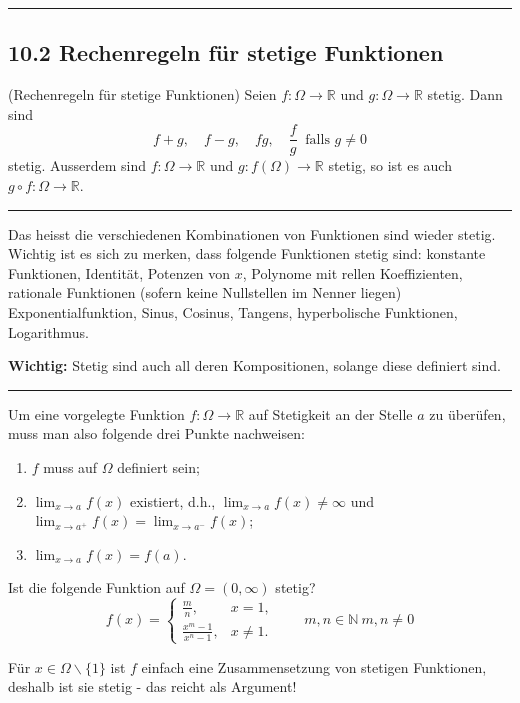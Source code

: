 \documentclass[a4paper,landscape,8pt]{extarticle}
\newcommand{\N}{\mathbb{N}}
\newcommand{\R}{\mathbb{R}}
\newcommand{\sep}{\vspace{5pt}\noindent\hrule\vspace{5pt}}
\newcommand{\Wichtig}{\textbf{Wichtig: }}
\begin{document}
\begin{multicols*}{4}
\sep

\subsection{10.2 Rechenregeln für stetige Funktionen}

\Satz (Rechenregeln für stetige Funktionen) Seien $f\colon\Omega\to\R$ und
$g\colon\Omega\to\R$ stetig. Dann sind
\[
f+g, \quad f-g, \quad fg, \quad \frac{f}{g} \ \text{ falls }g\neq 0
\]
stetig. Ausserdem sind $f\colon\Omega\to\R$ und $g\colon f(\Omega)\to\R$ stetig,
so ist es auch $g\circ f\colon\Omega\to\R$.

\sep

Das heisst die verschiedenen Kombinationen von Funktionen sind wieder stetig.
Wichtig ist es sich zu merken, dass folgende Funktionen stetig sind: konstante
Funktionen, Identität, Potenzen von $x$, Polynome mit rellen Koeffizienten,
rationale Funktionen (sofern keine Nullstellen im Nenner liegen)
Exponentialfunktion, Sinus, Cosinus, Tangens, hyperbolische Funktionen,
Logarithmus.

\Wichtig Stetig sind auch all deren Kompositionen, solange diese definiert sind.

\sep

 Um eine vorgelegte Funktion
$f\colon\Omega\to\R$ auf Stetigkeit an der Stelle $a$ zu überüfen, muss man also folgende drei Punkte nachweisen:
\begin{enumerate}[label=(\arabic*)]
  \item $f$ muss auf $\Omega$ definiert sein;
  \item $\lim_{x\to a}f(x)$ existiert, d.h., $\lim_{x\to a} f(x)\neq \infty$ und
  $\lim_{x\to a^+} f(x)=\lim_{x\to a^-} f(x)$;
  \item $\lim_{x\to a}f(x)=f(a)$.
\end{enumerate}

\begin{warmup}
\Bsp Ist die folgende Funktion auf $\Omega = (0,\infty)$ stetig?
\[
f(x)=\begin{cases}
\frac{m}{n}, & x=1,\\
\frac{x^m-1}{x^n-1}, & x\neq 1.
\end{cases}
\qquad m,n\in\N \ m,n\neq 0
\]

Für $x\in\Omega \backslash \{1\}$ ist $f$ einfach eine Zusammensetzung von
stetigen Funktionen, deshalb ist sie stetig - das reicht als Argument!


\end{warmup}
\end{multicols*}
\end{document}
